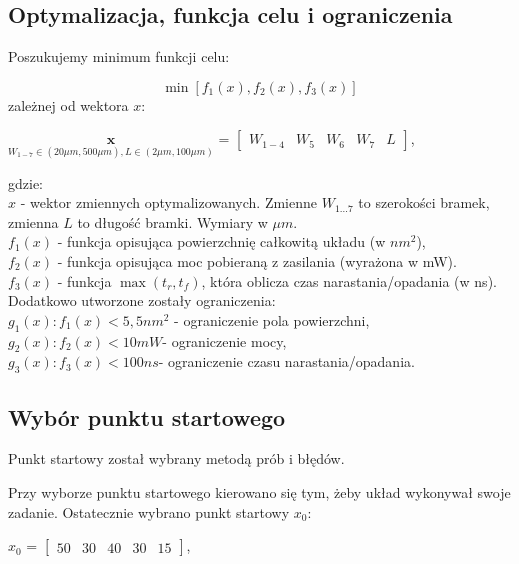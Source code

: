 \documentclass{article}
\begin{document}
\subsection{Optymalizacja, funkcja celu i ograniczenia}
Poszukujemy minimum funkcji celu: 

\[\min [f_1(x), f_2(x), f_3(x)]\]
zależnej od wektora \(x\): 

\begin{center}
$\underset{W_{1-7}\in (20\mu m, 500 \mu m) ,L\in(2\mu m, 100\mu m)}{\textbf{x}}$ = 
 	$\begin{bmatrix}
  		W_{1-4} & W_5 & W_6 & W_7 & L   
	\end{bmatrix}$,
\end{center}
gdzie: \\ 
\(x\) - wektor zmiennych optymalizowanych. Zmienne \(W_{1...7}\) to szerokości bramek, zmienna \(L\) to długość bramki. Wymiary w \(\mu m\).  \\
\(f_1(x)\) - funkcja opisująca powierzchnię całkowitą układu (w \(nm^2\)), \\
\(f_2(x)\) - funkcja opisująca moc pobieraną z zasilania (wyrażona w mW).\\
\(f_3(x)\) - funkcja \(\max(t_r,t_f)\), która oblicza czas narastania/opadania (w ns). \\

Dodatkowo utworzone zostały ograniczenia:\\
\(g_1(x): f_1(x)<5,5 nm^2\) - ograniczenie pola powierzchni,\\
\(g_2(x): f_2(x)<10 mW\)- ograniczenie mocy,\\
\(g_3(x): f_3(x)<100 ns\)- ograniczenie czasu narastania/opadania.\\




 
 

 

\subsection{Wybór punktu startowego}

Punkt startowy został wybrany metodą prób i błędów.

Przy wyborze punktu startowego kierowano się tym, żeby układ wykonywał swoje zadanie. Ostatecznie wybrano punkt startowy \(x_0\):

\begin{center}
 \(x_0\) = 
 	$\begin{bmatrix}
  		
  		50 & 30 & 40 & 30 & 15
	\end{bmatrix}$,
\end{center}
\end{document}
